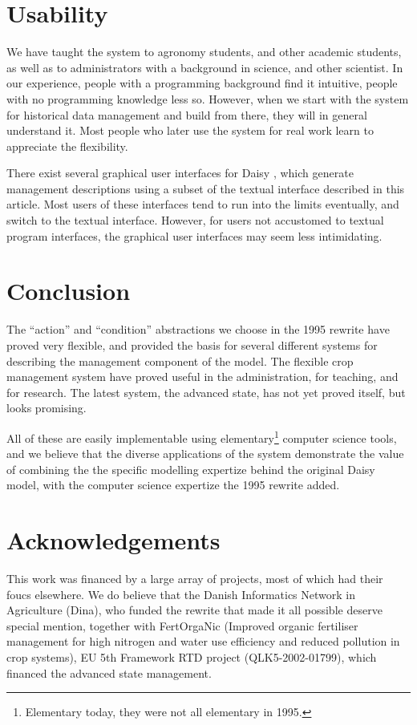 \documentclass[a4paper]{article}
\begin{document}
\section{Usability}

We have taught the system to agronomy students, and other academic
students, as well as to administrators with a background in science,
and other scientist.  In our experience, people with a programming
background find it intuitive, people with no programming knowledge
less so.  However, when we start with the system for historical data
management and build from there, they will in general understand it.
Most people who later use the system for real work learn to appreciate
the flexibility.

There exist several graphical user interfaces for Daisy
\cite{plantinfo-daisy,daisygis,fertorganic}, which generate management
descriptions using a subset of the textual interface described in this
article.  Most users of these interfaces tend to run into the limits
eventually, and switch to the textual interface.  However, for users
not accustomed to textual program interfaces, the graphical user
interfaces may seem less intimidating.

\section{Conclusion}

The ``action'' and ``condition'' abstractions we choose in the 1995
rewrite have proved very flexible, and provided the basis for several
different systems for describing the management component of the
model.  The flexible crop management system have proved useful in the
administration, for teaching, and for research.  The latest system, the
advanced state, has not yet proved itself, but looks promising.  

All of these are easily implementable using
elementary\footnote{Elementary today, they were not all elementary in
  1995.}  computer science tools, and we believe that the diverse
applications of the system demonstrate the value of combining the the
specific modelling expertize behind the original Daisy model, with the
computer science expertize the 1995 rewrite added.

\section{Acknowledgements}

This work was financed by a large array of projects, most of which had
their foucs elsewhere.  We do believe that the Danish Informatics
Network in Agriculture (Dina), who funded the rewrite that made it all
possible deserve special mention, together with FertOrgaNic (Improved
organic fertiliser management for high nitrogen and water use
efficiency and reduced pollution in crop systems), EU 5th Framework
RTD project (QLK5-2002-01799), which financed the advanced state
management.


\end{document}
